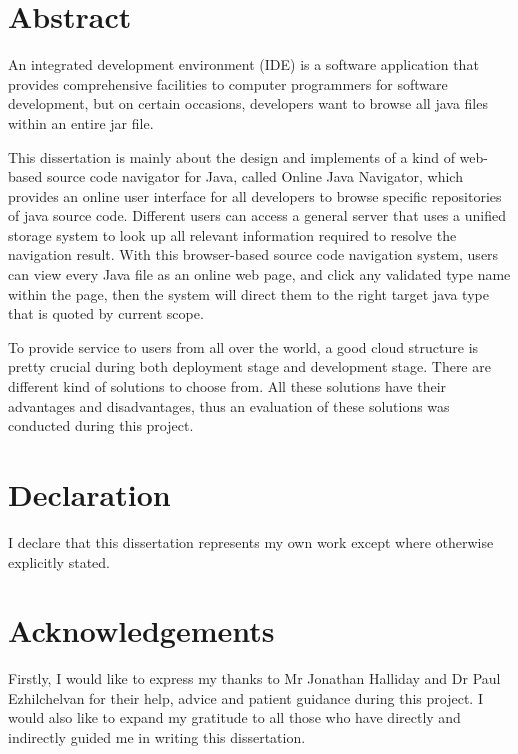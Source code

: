 \documentclass[runningheads]{llncs}
\begin{document}
\newpage
{}
\setcounter{page}{2}
\section*{Abstract}
An integrated development environment (IDE) is a software application that provides comprehensive facilities to computer programmers for software development\cite{Integrated_development_environment}, but on certain occasions, developers want to browse all java files within an entire jar file.

This dissertation is mainly about the design and implements of a kind of web-based source code navigator for Java, called Online Java Navigator, which provides an online user interface for all developers to browse specific repositories of java source code. Different users can access a general server that uses a unified storage system to look up all relevant information required to resolve the navigation result. With this browser-based source code navigation system, users can view every Java file as an online web page, and click any validated type name within the page, then the system will direct them to the right target java type that is quoted by current scope.

To provide service to users from all over the world, a good cloud structure is pretty crucial during both deployment stage and development stage. There are different kind of solutions to choose from. All these solutions have their advantages and disadvantages, thus an evaluation of these solutions was conducted during this project.

\section*{Declaration}

I declare that this dissertation represents my own work except where otherwise explicitly stated.

\newpage
\section*{Acknowledgements}

Firstly, I would like to express my thanks to Mr Jonathan Halliday and Dr Paul Ezhilchelvan for their help, advice and patient guidance during this project. I would also like to expand my gratitude to all those who have directly and indirectly guided me in writing this dissertation.
\end{document}
